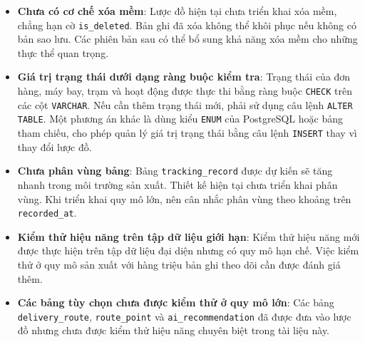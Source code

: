 \begin{itemize}
    \item \textbf{Chưa có cơ chế xóa mềm}: Lược đồ hiện tại chưa triển khai xóa mềm, chẳng hạn cờ \texttt{is\_deleted}. Bản ghi đã xóa không thể khôi phục nếu không có bản sao lưu. Các phiên bản sau có thể bổ sung khả năng xóa mềm cho những thực thể quan trọng.
    \item \textbf{Giá trị trạng thái dưới dạng ràng buộc kiểm tra}: Trạng thái của đơn hàng, máy bay, trạm và hoạt động được thực thi bằng ràng buộc \texttt{CHECK} trên các cột \texttt{VARCHAR}. Nếu cần thêm trạng thái mới, phải sử dụng câu lệnh \texttt{ALTER TABLE}. Một phương án khác là dùng kiểu \texttt{ENUM} của PostgreSQL hoặc bảng tham chiếu, cho phép quản lý giá trị trạng thái bằng câu lệnh \texttt{INSERT} thay vì thay đổi lược đồ.
    \item \textbf{Chưa phân vùng bảng}: Bảng \texttt{tracking\_record} được dự kiến sẽ tăng nhanh trong môi trường sản xuất. Thiết kế hiện tại chưa triển khai phân vùng. Khi triển khai quy mô lớn, nên cân nhắc phân vùng theo khoảng trên \texttt{recorded\_at}.
    \item \textbf{Kiểm thử hiệu năng trên tập dữ liệu giới hạn}: Kiểm thử hiệu năng mới được thực hiện trên tập dữ liệu đại diện nhưng có quy mô hạn chế. Việc kiểm thử ở quy mô sản xuất với hàng triệu bản ghi theo dõi cần được đánh giá thêm.
    \item \textbf{Các bảng tùy chọn chưa được kiểm thử ở quy mô lớn}: Các bảng \texttt{delivery\_route}, \texttt{route\_point} và \texttt{ai\_recommendation} đã được đưa vào lược đồ nhưng chưa được kiểm thử hiệu năng chuyên biệt trong tài liệu này.
\end{itemize}

